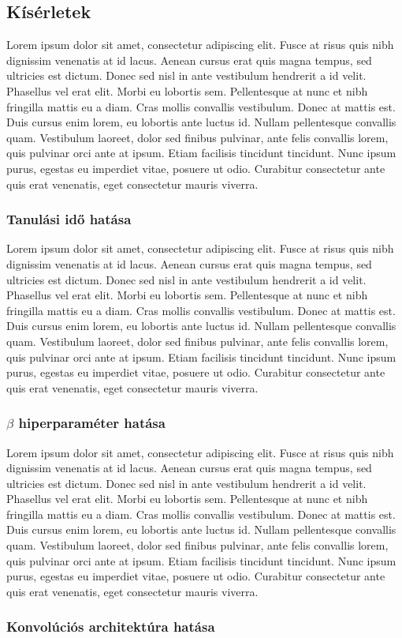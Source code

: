 \documentclass[12pt]{article}
\begin{document}
\subsection{Kísérletek}

Lorem ipsum dolor sit amet, consectetur adipiscing elit. Fusce at risus quis nibh dignissim venenatis at id lacus. Aenean cursus erat quis magna tempus, sed ultricies est dictum. Donec sed nisl in ante vestibulum hendrerit a id velit. Phasellus vel erat elit. Morbi eu lobortis sem. Pellentesque at nunc et nibh fringilla mattis eu a diam. Cras mollis convallis vestibulum. Donec at mattis est. Duis cursus enim lorem, eu lobortis ante luctus id. Nullam pellentesque convallis quam. Vestibulum laoreet, dolor sed finibus pulvinar, ante felis convallis lorem, quis pulvinar orci ante at ipsum. Etiam facilisis tincidunt tincidunt. Nunc ipsum purus, egestas eu imperdiet vitae, posuere ut odio. Curabitur consectetur ante quis erat venenatis, eget consectetur mauris viverra.

\subsubsection{Tanulási idő hatása}

Lorem ipsum dolor sit amet, consectetur adipiscing elit. Fusce at risus quis nibh dignissim venenatis at id lacus. Aenean cursus erat quis magna tempus, sed ultricies est dictum. Donec sed nisl in ante vestibulum hendrerit a id velit. Phasellus vel erat elit. Morbi eu lobortis sem. Pellentesque at nunc et nibh fringilla mattis eu a diam. Cras mollis convallis vestibulum. Donec at mattis est. Duis cursus enim lorem, eu lobortis ante luctus id. Nullam pellentesque convallis quam. Vestibulum laoreet, dolor sed finibus pulvinar, ante felis convallis lorem, quis pulvinar orci ante at ipsum. Etiam facilisis tincidunt tincidunt. Nunc ipsum purus, egestas eu imperdiet vitae, posuere ut odio. Curabitur consectetur ante quis erat venenatis, eget consectetur mauris viverra.

\subsubsection{$\beta$ hiperparaméter hatása}

Lorem ipsum dolor sit amet, consectetur adipiscing elit. Fusce at risus quis nibh dignissim venenatis at id lacus. Aenean cursus erat quis magna tempus, sed ultricies est dictum. Donec sed nisl in ante vestibulum hendrerit a id velit. Phasellus vel erat elit. Morbi eu lobortis sem. Pellentesque at nunc et nibh fringilla mattis eu a diam. Cras mollis convallis vestibulum. Donec at mattis est. Duis cursus enim lorem, eu lobortis ante luctus id. Nullam pellentesque convallis quam. Vestibulum laoreet, dolor sed finibus pulvinar, ante felis convallis lorem, quis pulvinar orci ante at ipsum. Etiam facilisis tincidunt tincidunt. Nunc ipsum purus, egestas eu imperdiet vitae, posuere ut odio. Curabitur consectetur ante quis erat venenatis, eget consectetur mauris viverra.

\subsubsection{Konvolúciós architektúra hatása}
\end{document}
